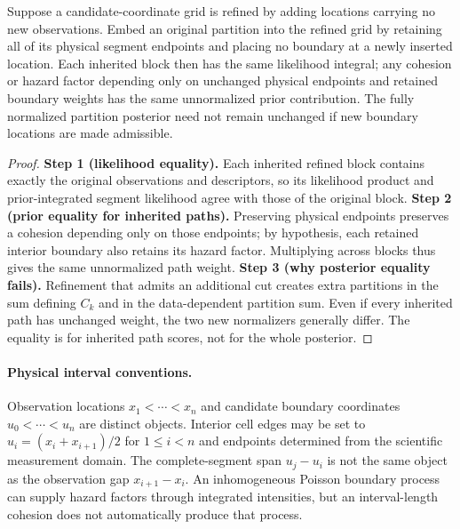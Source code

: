 \begin{proposition}
\label{prop:refinement-paper}
Suppose a candidate-coordinate grid is refined by adding locations carrying no new observations. Embed an original partition into the refined grid by retaining all of its physical segment endpoints and placing no boundary at a newly inserted location. Each inherited block then has the same likelihood integral; any cohesion or hazard factor depending only on unchanged physical endpoints and retained boundary weights has the same unnormalized prior contribution. The fully normalized partition posterior need not remain unchanged if new boundary locations are made admissible.
\end{proposition}
\begin{proof}
\textbf{Step 1 (likelihood equality).} Each inherited refined block contains exactly the original observations and descriptors, so its likelihood product and prior-integrated segment likelihood agree with those of the original block.
\textbf{Step 2 (prior equality for inherited paths).} Preserving physical endpoints preserves a cohesion depending only on those endpoints; by hypothesis, each retained interior boundary also retains its hazard factor. Multiplying across blocks thus gives the same unnormalized path weight.
\textbf{Step 3 (why posterior equality fails).} Refinement that admits an additional cut creates extra partitions in the sum defining $C_k$ and in the data-dependent partition sum. Even if every inherited path has unchanged weight, the two new normalizers generally differ. The equality is for inherited path scores, not for the whole posterior.
\end{proof}

\paragraph{Physical interval conventions.}
Observation locations $x_1<\cdots<x_n$ and candidate boundary coordinates $u_0<\cdots<u_n$ are distinct objects. Interior cell edges may be set to $u_i=(x_i+x_{i+1})/2$ for $1\le i<n$ and endpoints determined from the scientific measurement domain. The complete-segment span $u_j-u_i$ is not the same object as the observation gap $x_{i+1}-x_i$. An inhomogeneous Poisson boundary process can supply hazard factors through integrated intensities, but an interval-length cohesion does not automatically produce that process.
